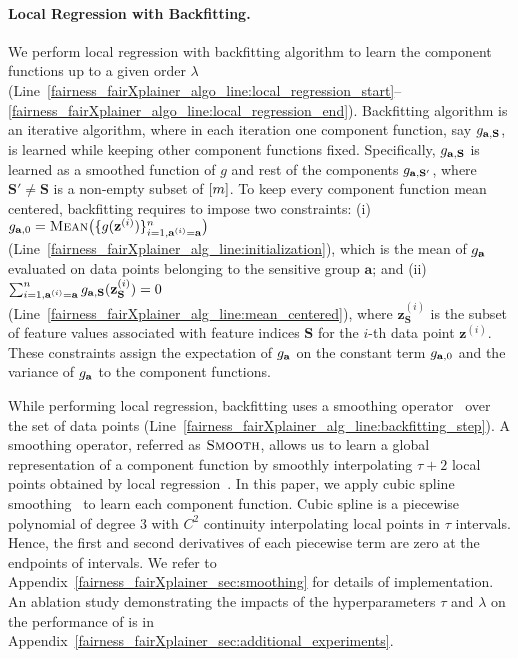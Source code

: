 \paragraph{Local Regression with Backfitting.} We perform local regression with backfitting algorithm to learn the component functions up to a given order $ \lambda $ (Line~\ref{fairness_fairXplainer_algo_line:local_regression_start}--\ref{fairness_fairXplainer_algo_line:local_regression_end}). Backfitting algorithm is an iterative algorithm, where in each iteration one component function, say $ g_{\mathbf{a}, \mathbf{S}} $, is learned while keeping other component functions fixed. Specifically, $ g_{\mathbf{a}, \mathbf{S}} $ is learned as a smoothed function of $ g $ and rest of the components $ g_{\mathbf{a}, \mathbf{S}'} $, where $ \mathbf{S}' \ne \mathbf{S} $ is a non-empty subset of $ [m] $. To keep every component function mean centered, backfitting requires to impose two constraints: (i) $ g_{\mathbf{a}, 0} = \textsc{Mean}\big(\{g(\mathbf{z}^{(i)})\}_{i=1, \mathbf{a}^{(i)} = \mathbf{a}}^n\big) $ (Line~\ref{fairness_fairXplainer_alg_line:initialization}), which is the mean of $ g_{\mathbf{a}} $ evaluated on data points belonging to the sensitive group $ \mathbf{a} $;  and (ii) $ \sum_{i=1, \mathbf{a}^{(i)} = \mathbf{a}}^ng_{\mathbf{a}, \mathbf{S}}(\mathbf{z}_{\mathbf{S}}^{(i)}) = 0$ (Line~\ref{fairness_fairXplainer_alg_line:mean_centered}), where $ \mathbf{z}_{\mathbf{S}}^{(i)} $ is the subset of feature values associated with feature indices $ \mathbf{S} $ for the $ i $-th data point $  \mathbf{z}^{(i)} $. These constraints assign the expectation of $ g_{\mathbf{a}} $ on the constant term $ g_{\mathbf{a}, 0} $ and the variance of $ g_{\mathbf{a}} $ to the component functions.                                       


While performing local regression, backfitting uses a smoothing operator~\cite{loader2012smoothing} over the set of data points (Line~\ref{fairness_fairXplainer_alg_line:backfitting_step}). A smoothing operator, referred as $ \textsc{Smooth} $, allows us to learn a global representation of a component function by smoothly interpolating $\tau + 2$ local points obtained by local regression~\cite{loader2012smoothing}. In this paper, we apply cubic spline smoothing~\cite{li2010global} to learn each component function. Cubic spline is a piecewise polynomial of degree $ 3 $ with $ C^2 $ continuity interpolating local points in $ \tau $ intervals. Hence, the first and second derivatives of each piecewise term are zero at the endpoints of intervals. We refer to Appendix~\ref{fairness_fairXplainer_sec:smoothing} for details of implementation. An ablation study demonstrating the impacts of the hyperparameters $\tau$ and $\lambda$ on the performance of {\fairXplainer} is in Appendix~\ref{fairness_fairXplainer_sec:additional_experiments}. %






